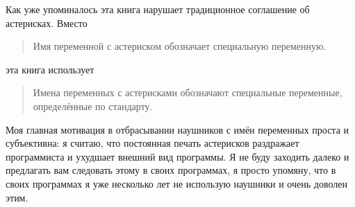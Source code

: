 Как уже упоминалось эта книга нарушает традиционное соглашение об астерисках. Вместо

\begin{quote}
Имя переменной с астериском обозначает специальную переменную.
\end{quote}

эта книга использует

\begin{quote}
Имена переменных с астерисками обозначают специальные переменные, определённые по стандарту.
\end{quote}

Моя главная мотивация в отбрасывании наушников с имён переменных проста и субъективна: я считаю, что постоянная печать астерисков раздражает программиста и ухудшает внешний вид программы. Я не буду заходить далеко и предлагать вам следовать этому в своих программах, я просто упомяну, что в своих программах я уже несколько лет не использую наушники и очень доволен этим.
